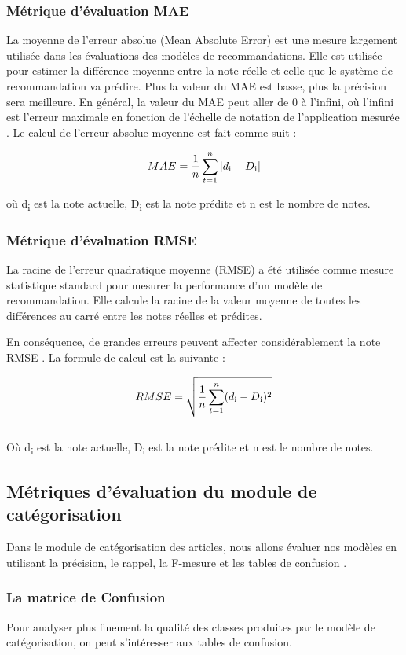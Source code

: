         \subsubsection{Métrique d'évaluation MAE}
        La moyenne de l'erreur absolue (Mean Absolute Error) est une mesure largement utilisée dans les évaluations des modèles de recommandations. Elle est utilisée pour estimer la différence moyenne entre la note réelle et celle que le système de recommandation va prédire. Plus la valeur du MAE est basse, plus la précision sera meilleure. En général, la valeur du MAE peut aller de 0 à l'infini, où l'infini est l'erreur maximale en fonction de l'échelle de notation de l'application mesurée \cite{rmse}. Le calcul de l'erreur absolue moyenne est fait comme suit :

        \[MAE = \frac{1}{n}\sum_{t=1}^{n}|d\textsubscript{i} - D\textsubscript{i}|\]

        où d\textsubscript{i} est la note actuelle, D\textsubscript{i} est la note prédite et n est le nombre de notes.

        \subsubsection{Métrique d'évaluation RMSE}
        La racine de l'erreur quadratique moyenne (RMSE) a été utilisée comme mesure statistique standard pour mesurer la performance d'un modèle de recommandation. Elle calcule la racine de la valeur moyenne de toutes les différences au carré entre les notes réelles et prédites. 

        En conséquence, de grandes erreurs peuvent affecter considérablement la note RMSE \cite{rmse}. La formule de calcul est la suivante :

        \[RMSE = \sqrt{\frac{1}{n}\sum_{t=1}^{n}(d\textsubscript{i} - D\textsubscript{i})^2}\] \\

        Où d\textsubscript{i} est la note actuelle, D\textsubscript{i} est la note prédite et n est le nombre de notes.

    \subsection{Métriques d'évaluation du module de catégorisation}\label{metrics}
    Dans le module de catégorisation des articles, nous allons évaluer nos modèles en utilisant la précision, le rappel, la F-mesure et les tables de confusion \cite{mesurecateg}.
        \subsubsection{La matrice de Confusion}
        Pour analyser plus finement la qualité des classes produites par le modèle de catégorisation, on peut s’intéresser aux tables de confusion.

